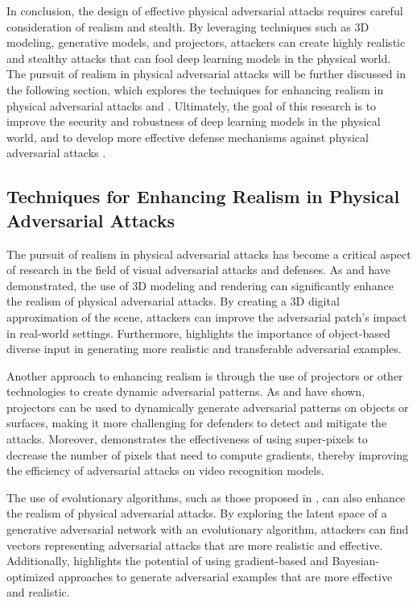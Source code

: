 \documentclass[11pt,a4paper]{article}
\begin{document}
In conclusion, the design of effective physical adversarial attacks requires careful consideration of realism and stealth. By leveraging techniques such as 3D modeling, generative models, and projectors, attackers can create highly realistic and stealthy attacks that can fool deep learning models in the physical world. The pursuit of realism in physical adversarial attacks will be further discussed in the following section, which explores the techniques for enhancing realism in physical adversarial attacks \cite{arxiv:1707.07397} and \cite{doi:10.1016/j.neucom.2022.05.031}. Ultimately, the goal of this research is to improve the security and robustness of deep learning models in the physical world, and to develop more effective defense mechanisms against physical adversarial attacks \cite{doi:10.1109/tnnls.2025.3561225}.


\subsection{Techniques for Enhancing Realism in Physical Adversarial Attacks}


The pursuit of realism in physical adversarial attacks has become a critical aspect of research in the field of visual adversarial attacks and defenses. As \cite{arxiv:1707.07397} and \cite{doi:10.1016/j.neucom.2022.05.031} have demonstrated, the use of 3D modeling and rendering can significantly enhance the realism of physical adversarial attacks. By creating a 3D digital approximation of the scene, attackers can improve the adversarial patch's impact in real-world settings. Furthermore, \cite{arxiv:2203.09123} highlights the importance of object-based diverse input in generating more realistic and transferable adversarial examples.

Another approach to enhancing realism is through the use of projectors or other technologies to create dynamic adversarial patterns. As \cite{arxiv:2001.05574} and \cite{doi:10.1109/eurosp53844.2022.00047} have shown, projectors can be used to dynamically generate adversarial patterns on objects or surfaces, making it more challenging for defenders to detect and mitigate the attacks. Moreover, \cite{doi:10.1609/aaai.v34i07.6918} demonstrates the effectiveness of using super-pixels to decrease the number of pixels that need to compute gradients, thereby improving the efficiency of adversarial attacks on video recognition models.

The use of evolutionary algorithms, such as those proposed in \cite{doi:10.1186/s41074-019-0053-3}, can also enhance the realism of physical adversarial attacks. By exploring the latent space of a generative adversarial network with an evolutionary algorithm, attackers can find vectors representing adversarial attacks that are more realistic and effective. Additionally, \cite{doi:10.1109/access.2024.3415356} highlights the potential of using gradient-based and Bayesian-optimized approaches to generate adversarial examples that are more effective and realistic.
\end{document}
